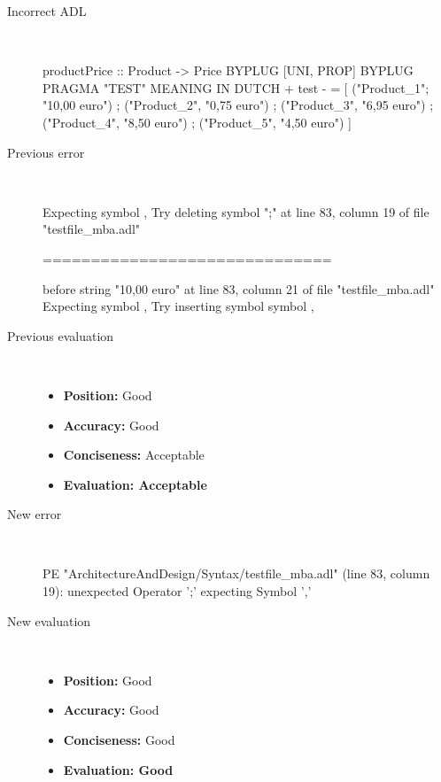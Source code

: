 \begin{description}
  \item[Incorrect ADL]~\\
\begin{adl}
productPrice :: Product -> Price BYPLUG [UNI, PROP] BYPLUG PRAGMA "TEST"
MEANING IN DUTCH  {+ test -}
  = [ ("Product_1"; "10,00 euro")
    ; ("Product_2", "0,75 euro")
    ; ("Product_3", "6,95 euro")
    ; ("Product_4", "8,50 euro")
    ; ("Product_5", "4,50 euro")
    ]\end{adl}
  \item[Previous error]~\\
\begin{haskell}
Expecting symbol ,
Try deleting symbol ";" at line 83, column 19 of file "testfile_mba.adl"

==============================

before string "10,00 euro" at line 83, column 21 of file "testfile_mba.adl"
Expecting symbol ,
Try inserting symbol symbol ,
\end{haskell}
  \item[Previous evaluation]~\\
    \begin{itemize}
    \item \textbf{Position:} Good
    \item \textbf{Accuracy:} Good
    \item \textbf{Conciseness:} Acceptable
    \item \textbf{Evaluation: Acceptable}
    \end{itemize}
  \item[New error]~\\
\begin{haskell}
PE "ArchitectureAndDesign/Syntax/testfile_mba.adl" (line 83, column 19):
unexpected Operator ';'
expecting Symbol ','\end{haskell}
  \item[New evaluation]~\\
    \begin{itemize}
    \item \textbf{Position:} Good
    \item \textbf{Accuracy:} Good
    \item \textbf{Conciseness:} Good
    \item \textbf{Evaluation: Good}
    \end{itemize}
  \end{description}

\hrulefill

